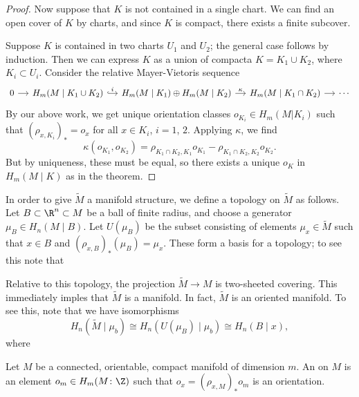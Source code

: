 \documentclass[main.tex]{subfiles}
\begin{document}
\begin{proof}
  Now suppose that \(K\) is not contained in a single chart. We can find an open cover of \(K\) by charts, and since \(K\) is compact, there exists a finite subcover.

  Suppose \(K\) is contained in two charts \(U_{1}\) and \(U_{2}\); the general case follows by induction. Then we can express \(K\) as a union of compacta \(K =  K_{1} \cup K_{2}\), where \(K_{i} \subset U_{i} \). Consider the relative Mayer-Vietoris sequence
  \begin{equation*}
    \begin{tikzcd}[column sep=small]
      0
      \arrow[r]
      & H_{m}(M\mid K_{1} \cup K_{2})
      \arrow[r, hook, "i"]
      & H_{m}(M\mid K_{1}) \oplus H_{m}(M\mid K_{2})
      \arrow[r, "\kappa"]
      & H_{m}(M\mid K_{1} \cap K_{2})
      \arrow[r]
      & \cdots
    \end{tikzcd}
  \end{equation*}
  By our above work, we get unique orientation classes \(o_{K_{i}} \in H_{m}(M | K_{i})\) such that \((\rho_{x, K_{i}})_{*} = o_{x}\) for all \(x \in K_{i}\), \(i = 1\), \(2\). Applying \(\kappa\), we find
  \begin{equation*}
    \kappa(o_{K_{1}}, o_{K_{2}}) = \rho_{K_{1} \cap K_{2}, K_{1}}o_{K_{1}} - \rho_{K_{1} \cap K_{2}, K_{2}}o_{K_{2}}.
  \end{equation*}
  But by uniqueness, these must be equal, so there exists a unique \(o_{K}\) in \(H_{m}(M \mid K)\) as in the theorem.
\end{proof}


In order to give \(\tilde{M}\) a manifold structure, we define a topology on \(\tilde{M}\) as follows. Let \(B \subset \R^{n} \subset M\) be a ball of finite radius, and choose a generator \(\mu_{B} \in H_{n}(M \mid B)\). Let \(U(\mu_{B})\) be the subset consisting of elements \(\mu_{x} \in \tilde{M}\) such that \(x \in B\) and \((\rho_{x,B})_{*}(\mu_{B}) = \mu_{x}\). These form a basis for a topology; to see this note that

Relative to this topology, the projection \(\tilde{M} \to M\) is two-sheeted covering. This immediately imples that \(\tilde{M}\) is a manifold. In fact, \(\tilde{M}\) is an oriented manifold. To see this, note that we have isomorphisms
\begin{equation*}
  H_{n}(\tilde{M} \mid \mu_{b}) \cong H_{n}(U(\mu_{B}) \mid \mu_{b}) \cong H_{n}(B \mid x),
\end{equation*}
where


\begin{definition}
  \label{def:orientation_class}
  Let \(M\) be a connected, orientable, compact manifold of dimension \(m\). An  on \(M\) is an element \(o_{m} \in H_{m}(M\colon \Z)\) such that \(o_{x} = (\rho_{x, M})_{*} o_{m}\)  is an orientation.
\end{definition}
\end{document}

